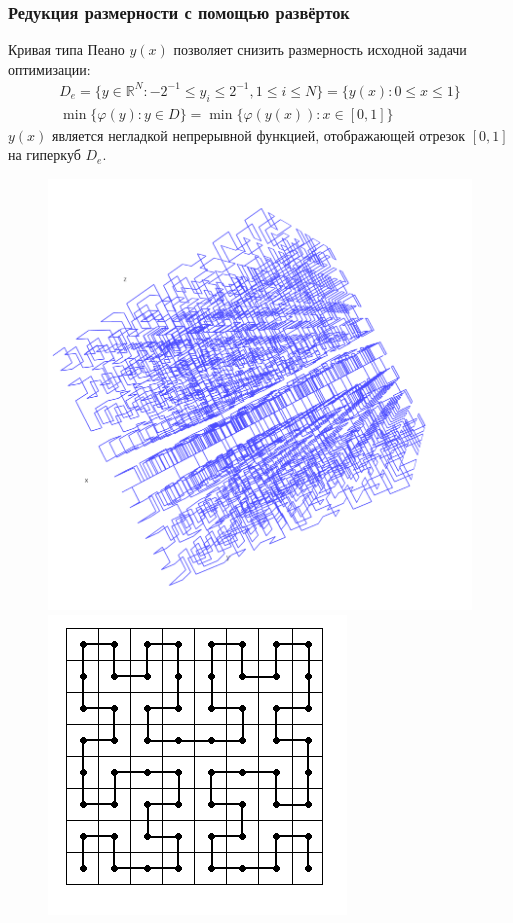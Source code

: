 \documentclass[aspectratio=1610]{beamer}
\begin{document}
\begin{frame}
  \frametitle{Редукция размерности с помощью развёрток}
  \begin{center}
  Кривая типа Пеано \(y(x)\) позволяет снизить размерность исходной задачи оптимизации:
  \begin{gather}
    D_e=\lbrace y\in \mathbb{R}^N:-2^{-1}\leqslant y_i\leqslant 2^{-1},1\leqslant i\leqslant N\rbrace=\{y(x):0\leqslant x\leqslant 1\} \nonumber \\
    \min\{\varphi(y): y\in D\}=\min\{\varphi(y(x)): x\in [0,1]\} \nonumber
  \end{gather}
  \(y(x)\) является негладкой непрерывной функцией, отображающей отрезок \([0,1]\) на гиперкуб \(D_e\).
  \begin{figure}[ht]
    \includegraphics[width=.3\textwidth]{peano3d.png}
    \includegraphics[width=.3\textwidth]{peano2d.png}
  \end{figure}
\end{center}
\end{frame}
\end{document}
